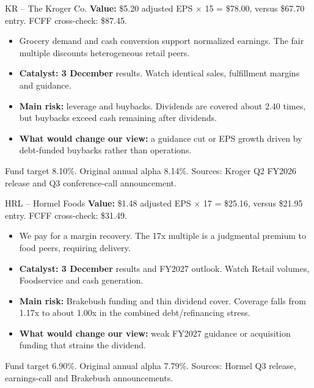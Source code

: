 \documentclass[aspectratio=169,11pt,t]{beamer}
\newcommand{\smnote}[1]{{\footnotesize\color{muted}#1}}
\newcommand{\tight}{\setlength{\itemsep}{0.45em}\setlength{\parskip}{0pt}}
\begin{document}
\begin{frame}{KR -- The Kroger Co.}
\vspace{.1em}
\textbf{Value:} \$5.20 adjusted EPS $\times$ 15 = \$78.00, versus \$67.70 entry. FCFF cross-check: \$87.45.
\begin{itemize}\tight
\item Grocery demand and cash conversion support normalized earnings. The fair multiple discounts heterogeneous retail peers.
\item \textbf{Catalyst: 3 December} results. Watch identical sales, fulfillment margins and guidance.
\item \textbf{Main risk:} leverage and buybacks. Dividends are covered about 2.40 times, but buybacks exceed cash remaining after dividends.
\item \textbf{What would change our view:} a guidance cut or EPS growth driven by debt-funded buybacks rather than operations.
\end{itemize}
\smnote{Fund target 8.10\%. Original annual alpha 8.14\%. Sources: Kroger Q2 FY2026 release and Q3 conference-call announcement.}
\end{frame}


\begin{frame}{HRL -- Hormel Foods}
\vspace{.1em}
\textbf{Value:} \$1.48 adjusted EPS $\times$ 17 = \$25.16, versus \$21.95 entry. FCFF cross-check: \$31.49.
\begin{itemize}\tight
\item We pay for a margin recovery. The 17x multiple is a judgmental premium to food peers, requiring delivery.
\item \textbf{Catalyst: 3 December} results and FY2027 outlook. Watch Retail volumes, Foodservice and cash generation.
\item \textbf{Main risk:} Brakebush funding and thin dividend cover. Coverage falls from 1.17x to about 1.00x in the combined debt/refinancing stress.
\item \textbf{What would change our view:} weak FY2027 guidance or acquisition funding that strains the dividend.
\end{itemize}
\smnote{Fund target 6.90\%. Original annual alpha 7.79\%. Sources: Hormel Q3 release, earnings-call and Brakebush announcements.}
\end{frame}
\end{document}
